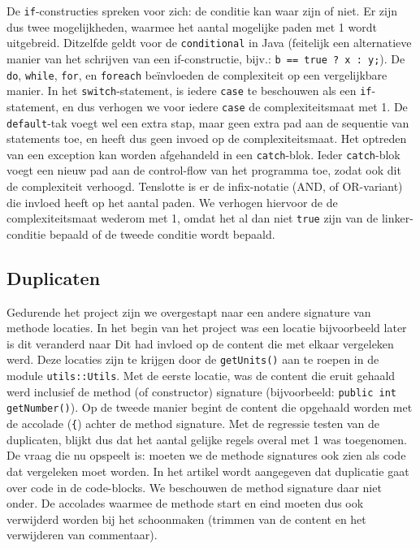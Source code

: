 \documentclass[a4paper]{article}
\begin{document}
De \texttt{if}-constructies spreken voor zich: de conditie kan
waar zijn of niet. Er zijn dus twee mogelijkheden, waarmee het
aantal mogelijke paden met 1 wordt uitgebreid. Ditzelfde geldt
voor de \texttt{conditional} in Java (feitelijk een alternatieve
manier van het schrijven van een if-constructie, bijv.:
\texttt{b == true ? x : y;}). De \texttt{do}, \texttt{while},
\texttt{for}, en \texttt{foreach} be\"invloeden de complexiteit
op een vergelijkbare manier. In het \texttt{switch}-statement,
is iedere \texttt{case} te beschouwen als een
\texttt{if}-statement, en dus verhogen we voor iedere
\texttt{case} de complexiteitsmaat met 1.
De \texttt{default}-tak voegt wel een extra stap, maar geen
extra pad aan de sequentie van statements toe, en heeft dus geen
invoed op de complexiteitsmaat.
Het optreden van een exception kan worden afgehandeld in een
\texttt{catch}-blok. Ieder \texttt{catch}-blok voegt een nieuw
pad aan de control-flow van het programma toe, zodat ook dit de
complexiteit verhoogd.
Tenslotte is er de infix-notatie (AND, of OR-variant) die
invloed heeft op het aantal paden. We verhogen hiervoor de de
complexiteitsmaat wederom met 1, omdat het al dan niet
\texttt{true} zijn van de linker-conditie bepaald of de tweede
conditie wordt bepaald.

\subsection{Duplicaten}
Gedurende het project zijn we 
overgestapt naar een andere
signature van methode locaties. 
In het begin van het project was
een locatie bijvoorbeeld
later is dit veranderd naar
Dit had invloed op de content die met elkaar vergeleken werd.
Deze locaties zijn te krijgen door de \texttt{getUnits()} aan te
roepen in de module \texttt{utils::Utils}. Met de eerste
locatie, was de content die eruit gehaald werd inclusief de
method (of constructor) signature (bijvoorbeeld: \texttt{public
int getNumber()}). Op de tweede manier begint de content die
opgehaald worden met de accolade (\texttt{\{}) achter de method
signature. Met de regressie testen van de duplicaten, blijkt dus
dat het aantal gelijke regels overal met 1 was toegenomen. De vraag die nu opspeelt is: moeten we de methode signatures ook zien als code dat vergeleken moet worden. In het artikel wordt aangegeven dat duplicatie gaat over code in de code-blocks. We beschouwen de method signature daar niet onder. De accolades waarmee de methode start en eind moeten dus ook verwijderd worden bij het schoonmaken (trimmen van de content en het verwijderen van commentaar).
\end{document}
